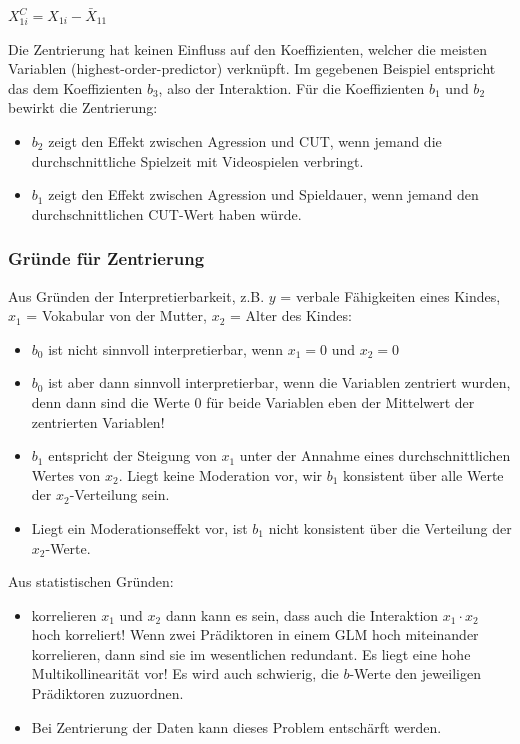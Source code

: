 \documentclass[]{article}
\providecommand{\tightlist}{%
  \setlength{\itemsep}{0pt}\setlength{\parskip}{0pt}}
\begin{document}
\(X^C_{1i} = X_{1i} - \bar{X}_{11}\)

Die Zentrierung hat keinen Einfluss auf den Koeffizienten, welcher die meisten Variablen (highest-order-predictor) verknüpft. Im gegebenen Beispiel entspricht das dem Koeffizienten \(b_3\), also der Interaktion. Für die Koeffizienten \(b_1\) und \(b_2\) bewirkt die Zentrierung:

\begin{itemize}
\tightlist
\item
  \(b_2\) zeigt den Effekt zwischen Agression und CUT, wenn jemand die durchschnittliche Spielzeit mit Videospielen verbringt.
\item
  \(b_1\) zeigt den Effekt zwischen Agression und Spieldauer, wenn jemand den durchschnittlichen CUT-Wert haben würde.
\end{itemize}

\hypertarget{grunde-fur-zentrierung}{%
\subsubsection*{Gründe für Zentrierung}\label{grunde-fur-zentrierung}}

Aus Gründen der Interpretierbarkeit, z.B. \(y\) = verbale Fähigkeiten eines Kindes, \(x_1\) = Vokabular von der Mutter, \(x_2\) = Alter des Kindes:

\begin{itemize}
\tightlist
\item
  \(b_0\) ist nicht sinnvoll interpretierbar, wenn \(x_1 = 0\) und \(x_2 = 0\)
\item
  \(b_0\) ist aber dann sinnvoll interpretierbar, wenn die Variablen zentriert wurden, denn dann sind die Werte 0 für beide Variablen eben der Mittelwert der zentrierten Variablen!
\item
  \(b_1\) entspricht der Steigung von \(x_1\) unter der Annahme eines durchschnittlichen Wertes von \(x_2\). Liegt keine Moderation vor, wir \(b_1\) konsistent über alle Werte der \(x_2\)-Verteilung sein.
\item
  Liegt ein Moderationseffekt vor, ist \(b_1\) nicht konsistent über die Verteilung der \(x_2\)-Werte.
\end{itemize}

Aus statistischen Gründen:

\begin{itemize}
\tightlist
\item
  korrelieren \(x_1\) und \(x_2\) dann kann es sein, dass auch die Interaktion \(x_1 \cdot x_2\) hoch korreliert! Wenn zwei Prädiktoren in einem GLM hoch miteinander korrelieren, dann sind sie im wesentlichen redundant. Es liegt eine hohe Multikollinearität vor! Es wird auch schwierig, die \(b\)-Werte den jeweiligen Prädiktoren zuzuordnen.
\item
  Bei Zentrierung der Daten kann dieses Problem entschärft werden.
\end{itemize}
\end{document}
